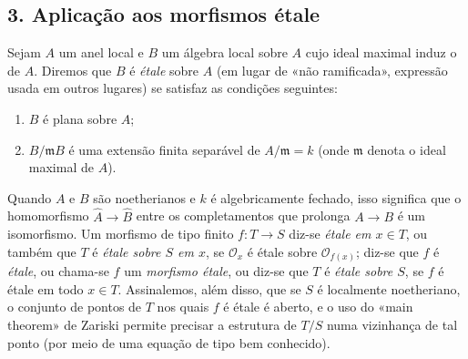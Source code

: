 \subsection*{3. Aplicação aos morfismos étale}

Sejam $A$ um anel local e $B$ um álgebra local sobre $A$ cujo ideal maximal
induz o de $A$. Diremos que $B$ é \emph{étale} sobre $A$ (em lugar de
«não ramificada», expressão usada em outros lugares) se satisfaz as condições
seguintes:
\begin{enumerate}
\item[(i)] $B$ é plana sobre $A$;
\item[(ii)] $B/\mathfrak mB$ é uma extensão finita separável de
$A/\mathfrak m=k$ (onde $\mathfrak m$ denota o ideal maximal de $A$).
\end{enumerate}
Quando $A$ e $B$ são noetherianos e $k$ é algebricamente fechado, isso
significa que o homomorfismo $\widehat A\longrightarrow\widehat B$ entre os
completamentos que prolonga $A\longrightarrow B$ é um isomorfismo. Um morfismo de
tipo finito $f:T\longrightarrow S$ diz-se \emph{étale em $x\in T$}, ou também
que $T$ é \emph{étale sobre $S$ em $x$}, se $\mathcal O_x$ é étale sobre
$\mathcal O_{f(x)}$; diz-se que $f$ é \emph{étale}, ou chama-se $f$ um
\emph{morfismo étale}, ou diz-se que $T$ é \emph{étale sobre $S$}, se $f$ é
étale em todo $x\in T$. Assinalemos, além disso, que se $S$ é localmente
noetheriano, o conjunto de pontos de $T$ nos quais $f$ é étale é aberto, e
o uso do «main theorem» de Zariski permite precisar a estrutura de $T/S$
numa vizinhança de tal ponto (por meio de uma equação de tipo bem conhecido).

